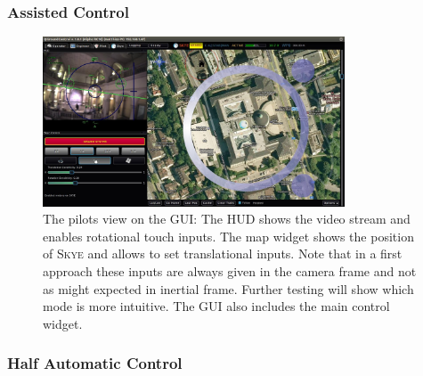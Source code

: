 \subsubsection{Assisted Control}



\begin{figure}[H] %
	\begin{center}
		\includegraphics[width=0.8\textwidth]{qgc_manual_control}
		\caption[Manual control view of Graphical User Interface]{The pilots view on the GUI\footnotemark : The HUD shows the video stream and enables rotational touch inputs. The map widget shows the position of \textsc{Skye} and allows to set translational inputs. Note that in a first approach these inputs are always given in the camera frame and not as might expected in inertial frame. Further testing will show which mode is more intuitive. The GUI also includes the main control widget.}  
		\label{figure:qgc_manual_control}		
	\end{center}
\end{figure}


\subsubsection{Half Automatic Control}

